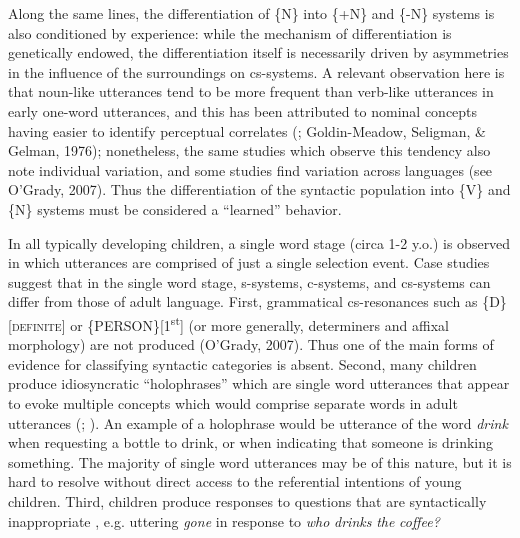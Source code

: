Along the same lines, the differentiation of \{N\} into \{+N\} and \{-N\} systems is also conditioned by experience: while the mechanism of differentiation is genetically endowed, the differentiation itself is necessarily driven by asymmetries in the influence of the surroundings on cs-systems. A relevant observation here is that noun-like utterances tend to be more frequent than verb-like utterances in early one-word utterances, and this has been attributed to nominal concepts having easier to identify perceptual correlates (\citealt{Gentner1982}; Goldin-Meadow, Seligman, \& Gelman, 1976); nonetheless, the same studies which observe this tendency also note individual variation, and some studies find variation across languages (see O’Grady, 2007). Thus the differentiation of the syntactic population into \{V\} and \{N\} systems must be considered a “learned” behavior.

In all typically developing children, a single word stage (circa 1-2 y.o.) is observed in which utterances are comprised of just a single selection event. Case studies suggest that in the single word stage, s-systems, c-systems, and cs-systems can differ from those of adult language. First, grammatical cs-resonances such as \{D\}[\textsc{definite}] or \{PERSON\}[1\textsuperscript{st}] (or more generally, determiners and affixal morphology) are not produced (O’Grady, 2007). Thus one of the main forms of evidence for classifying syntactic categories is absent. Second, many children produce idiosyncratic “holophrases” which are single word utterances that appear to evoke multiple concepts which would comprise separate words in adult utterances (\citealt{Dore1975}; \citealt{Tomasello2008}). An example of a holophrase would be utterance of the word \textit{drink} when requesting a bottle to drink, or when indicating that someone is drinking something. The majority of single word utterances may be of this nature, but it is hard to resolve without direct access to the referential intentions of young children. Third, children produce responses to questions that are syntactically inappropriate \citep{Radford1990}, e.g. uttering \textit{gone} in response to \textit{who} \textit{drinks} \textit{the} \textit{coffee?} 

